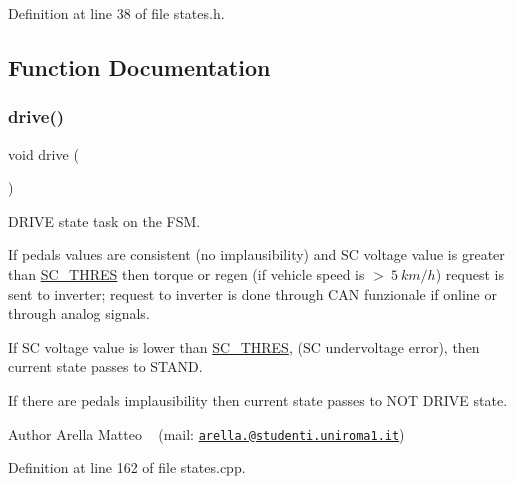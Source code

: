 Definition at line 38 of file states.\+h.



\subsection{Function Documentation}
\mbox{\label{group__stages__group_ga928e32686c7e00c1ecde24c3da3019f7}} 
\subsubsection{\texorpdfstring{drive()}{drive()}}
{\footnotesize\ttfamily void drive (\begin{DoxyParamCaption}{ }\end{DoxyParamCaption})}



D\+R\+I\+VE state task on the F\+SM. 

If pedals values are consistent (no implausibility) and SC voltage value is greater than \mbox{\hyperlink{group__stages__group_ga9688af4f17ae88b4d149269d71b7ff1f}{S\+C\+\_\+\+T\+H\+R\+ES}} then torque or regen (if vehicle speed is $>\ 5\ km/h$) request is sent to inverter; request to inverter is done through C\+AN funzionale if online or through analog signals.

If SC voltage value is lower than \mbox{\hyperlink{group__stages__group_ga9688af4f17ae88b4d149269d71b7ff1f}{S\+C\+\_\+\+T\+H\+R\+ES}}, (SC undervoltage error), then current state passes to S\+T\+A\+ND.

If there are pedals implausibility then current state passes to N\+OT D\+R\+I\+VE state.

\begin{DoxyAuthor}{Author}
Arella Matteo ~\newline
 (mail\+: \href{mailto:arella.1646983@studenti.uniroma1.it}{\tt arella.@studenti.\+uniroma1.\+it}) 
\end{DoxyAuthor}


Definition at line 162 of file states.\+cpp.

\mbox{\label{group__stages__group_ga2802a8c3f0174f4e54dd2381968212a0}} 
